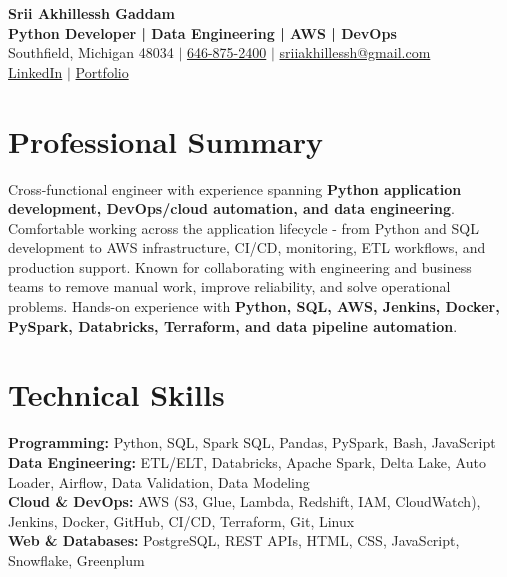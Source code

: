 \documentclass[letterpaper,10pt]{article}
\begin{document}
\fontsize{9.35pt}{10.45pt}\selectfont

\begin{center}
    {\LARGE \textbf{Srii Akhillessh Gaddam}} \\[-1pt]
    \textbf{Python Developer | Data Engineering | AWS | DevOps} \\[2pt]
    Southfield, Michigan 48034 $|$
    \href{tel:6468752400}{646-875-2400} $|$
    \href{mailto:sriiakhillessh@gmail.com}{sriiakhillessh@gmail.com} \\[1pt]
    \href{https://www.linkedin.com/in/srii-akhiilessh-gaddam-b48668191/}{LinkedIn} $|$
    \href{https://sriiakhillesshg.github.io/portfolio/}{Portfolio}
\end{center}
\vspace{-8pt}

\section{Professional Summary}
\small{Cross-functional engineer with experience spanning \textbf{Python application development, DevOps/cloud automation, and data engineering}. Comfortable working across the application lifecycle - from Python and SQL development to AWS infrastructure, CI/CD, monitoring, ETL workflows, and production support. Known for collaborating with engineering and business teams to remove manual work, improve reliability, and solve operational problems. Hands-on experience with \textbf{Python, SQL, AWS, Jenkins, Docker, PySpark, Databricks, Terraform, and data pipeline automation}.}

\section{Technical Skills}
\small{
\textbf{Programming:} Python, SQL, Spark SQL, Pandas, PySpark, Bash, JavaScript \\
\textbf{Data Engineering:} ETL/ELT, Databricks, Apache Spark, Delta Lake, Auto Loader, Airflow, Data Validation, Data Modeling \\
\textbf{Cloud \& DevOps:} AWS (S3, Glue, Lambda, Redshift, IAM, CloudWatch), Jenkins, Docker, GitHub, CI/CD, Terraform, Git, Linux \\
\textbf{Web \& Databases:} PostgreSQL, REST APIs, HTML, CSS, JavaScript, Snowflake, Greenplum
}
\end{document}
